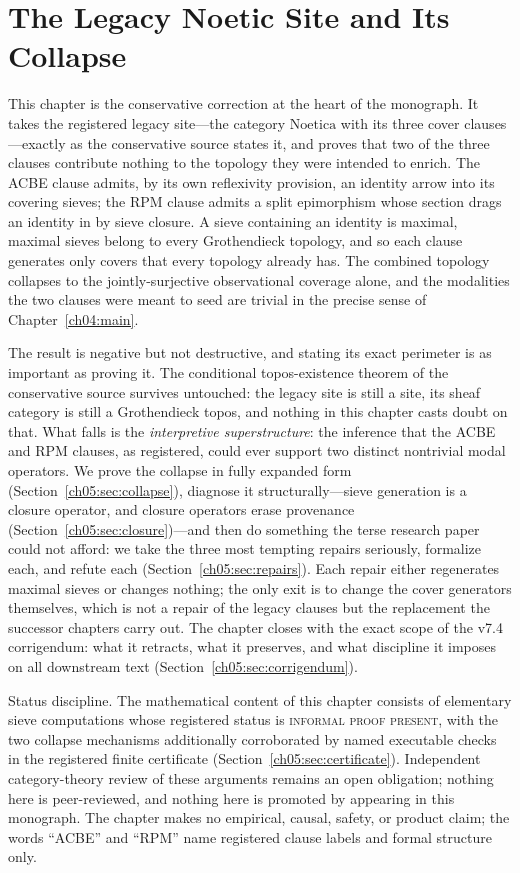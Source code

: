 \chapter{The Legacy Noetic Site and Its Collapse}\label{ch05:main}

This chapter is the conservative correction at the heart of the monograph. It
takes the registered legacy site---the category $\mathrm{Noetica}$ with its
three cover clauses---exactly as the conservative source states it, and proves
that two of the three clauses contribute nothing to the topology they were
intended to enrich. The ACBE clause admits, by its own reflexivity provision,
an identity arrow into its covering sieves; the RPM clause admits a split
epimorphism whose section drags an identity in by sieve closure. A sieve
containing an identity is maximal, maximal sieves belong to every Grothendieck
topology, and so each clause generates only covers that every topology already
has. The combined topology collapses to the jointly-surjective observational
coverage alone, and the modalities the two clauses were meant to seed are
trivial in the precise sense of Chapter~\ref{ch04:main}.

The result is negative but not destructive, and stating its exact perimeter is
as important as proving it. The conditional topos-existence theorem of the
conservative source survives untouched: the legacy site is still a site, its
sheaf category is still a Grothendieck topos, and nothing in this chapter
casts doubt on that. What falls is the \emph{interpretive superstructure}: the
inference that the ACBE and RPM clauses, as registered, could ever support two
distinct nontrivial modal operators. We prove the collapse in fully expanded
form (Section~\ref{ch05:sec:collapse}), diagnose it structurally---sieve
generation is a closure operator, and closure operators erase provenance
(Section~\ref{ch05:sec:closure})---and then do something the terse research
paper could not afford: we take the three most tempting repairs seriously,
formalize each, and refute each (Section~\ref{ch05:sec:repairs}). Each repair
either regenerates maximal sieves or changes nothing; the only exit is to
change the cover generators themselves, which is not a repair of the legacy
clauses but the replacement the successor chapters carry out. The chapter
closes with the exact scope of the v7.4 corrigendum: what it retracts, what it
preserves, and what discipline it imposes on all downstream text
(Section~\ref{ch05:sec:corrigendum}).

\begin{boundary}\label{ch05:bnd:status}
Status discipline. The mathematical content of this chapter consists of
elementary sieve computations whose registered status is \textsc{informal
proof present}, with the two collapse mechanisms additionally corroborated by
named executable checks in the registered finite certificate
(Section~\ref{ch05:sec:certificate}). Independent category-theory review of
these arguments remains an open obligation; nothing here is peer-reviewed,
and nothing here is promoted by appearing in this monograph. The chapter
makes no empirical, causal, safety, or product claim; the words ``ACBE'' and
``RPM'' name registered clause labels and formal structure only.
\end{boundary}

